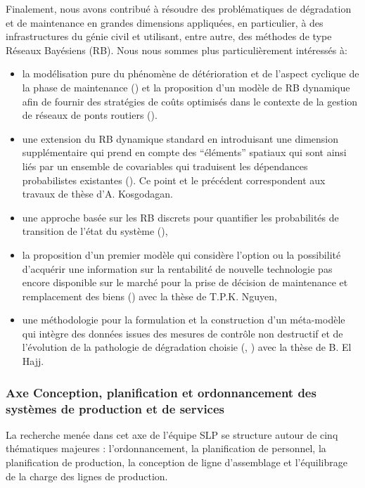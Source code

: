 Finalement, nous avons contribué à résoudre des problématiques de
dégradation et de maintenance en grandes dimensions appliquées, en
particulier, à des infrastructures du génie civil et utilisant, entre
autre, des méthodes de type Réseaux Bayésiens (RB). Nous nous sommes
plus particulièrement intéressés à:
\begin{itemize}
\item la modélisation pure du phénomène de détérioration et de
  l'aspect cyclique de la phase de maintenance
  (\cite{kosgodagan:hal-01517154}) et la proposition d'un modèle de RB
  dynamique afin de fournir des stratégies de coûts optimisés dans le
  contexte de la gestion de réseaux de ponts routiers
  (\cite{kosgodagandallatorre:hal-01517168}).
\item une extension du RB dynamique standard en introduisant une
  dimension supplémentaire qui prend en compte des ``éléments''
  spatiaux qui sont ainsi liés par un ensemble de covariables qui
  traduisent les dépendances probabilistes existantes
  (\cite{kosgodagan:hal-01517174}). Ce point et le précédent
  correspondent aux travaux de thèse d'A. Kosgodagan.
\item une approche basée sur les RB discrets pour quantifier les
  probabilités de transition de l'état du système
  (\cite{acharige:hal-01152564}),
\item la proposition d'un premier modèle qui considère l'option ou la
  possibilité d'acquérir une information sur la rentabilité de
  nouvelle technologie pas encore disponible sur le marché pour la
  prise de décision de maintenance et remplacement des biens
  (\cite{nguyen:hal-01520843}) avec la thèse de T.P.K. Nguyen,
\item une méthodologie pour la formulation et la construction d'un
  méta-modèle qui intègre des données issues des mesures de contrôle
  non destructif et de l'évolution de la pathologie de dégradation
  choisie (\cite{elhajj:hal-01520822}, \cite{elhajj:hal-01316236})
  avec la thèse de B. El Hajj.
\end{itemize}

  \subsubsection{Axe Conception, planification et ordonnancement des systèmes de production et de services}
  
La recherche menée dans cet axe de l’équipe SLP se structure autour de cinq thématiques majeures : l’ordonnancement, la planification de personnel, la planification de production, la conception de ligne d’assemblage et l’équilibrage de la charge des lignes de production. \\

